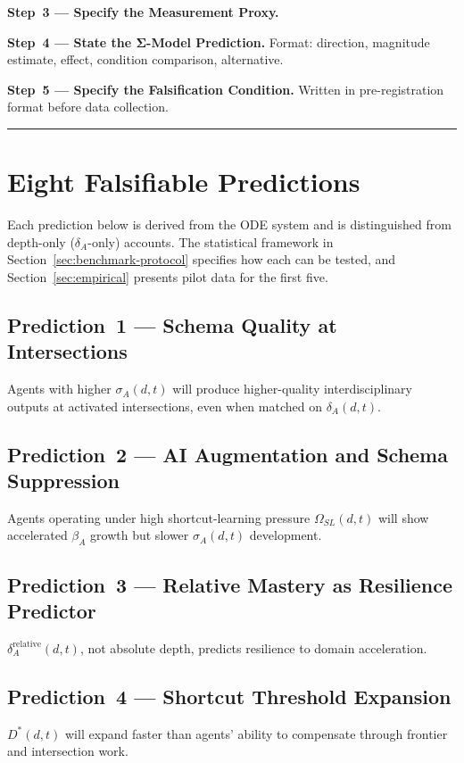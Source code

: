 \documentclass[11pt,a4paper]{article}
\begin{document}
\textbf{Step~3 --- Specify the Measurement Proxy.}

\textbf{Step~4 --- State the Σ-Model Prediction.} Format: direction,
magnitude estimate, effect, condition comparison, alternative.

\textbf{Step~5 --- Specify the Falsification Condition.} Written in
pre-registration format before data collection.

\noindent\rule{\linewidth}{0.4pt}

\section{Eight Falsifiable Predictions}\label{sec:predictions}

Each prediction below is derived from the ODE system and is distinguished from depth-only ($\delta_A$-only) accounts. The statistical framework in Section~\ref{sec:benchmark-protocol} specifies how each can be tested, and Section~\ref{sec:empirical} presents pilot data for the first five.

\subsection{Prediction~1 --- Schema Quality at Intersections}
Agents with higher $\sigma_A(d,t)$ will produce higher-quality
interdisciplinary outputs at activated intersections, even when matched
on $\delta_A(d,t)$.

\subsection{Prediction~2 --- AI Augmentation and Schema Suppression}
Agents operating under high shortcut-learning pressure $\Omega_{SL}(d,t)$ will show accelerated $\beta_A$
growth but slower $\sigma_A(d,t)$ development.

\subsection{Prediction~3 --- Relative Mastery as Resilience Predictor}
$\delta_A^{\text{relative}}(d,t)$, not absolute depth, predicts
resilience to domain acceleration.

\subsection{Prediction~4 --- Shortcut Threshold Expansion}
$D^*(d,t)$ will expand faster than agents' ability to compensate through
frontier and intersection work.
\end{document}

